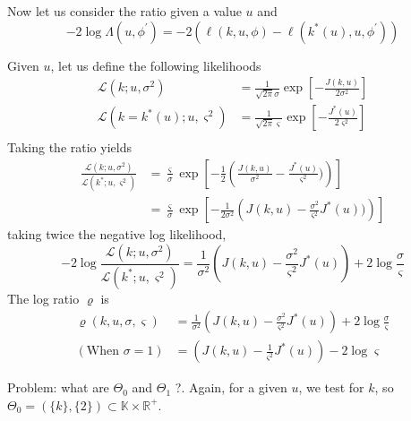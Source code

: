 \documentclass[a4paper,11pt]{article}
\newcommand{\Kspace}{\mathbb{K}}
\theoremstyle{defi}
\numberwithin{thmCounter}{section}
\begin{document}
Now let us consider the ratio given a value $u$ and  
\begin{equation}
  -2\log\Lambda(u, \phi^\prime) = -2\left(\ell(k, u, \phi) - \ell(k^*(u), u, \phi^\prime) \right)
\end{equation}

Given $u$, let us define the following likelihoods
\begin{align}
  \mathcal{L}(k ; u, \sigma^2) &= \frac{1}{\sqrt{2\pi}\sigma}\exp\left[-\frac{J(k,u)}{2\sigma^2}\right] \\
  \mathcal{L}(k=k^*(u) ; u, \varsigma^2) &= \frac{1}{\sqrt{2\pi}\varsigma}\exp\left[-\frac{J^*(u)}{2\varsigma^2}\right] \\
\end{align}
Taking the ratio yields
\begin{align}
  \frac{\mathcal{L}(k;u,\sigma^2)}{\mathcal{L}(k^*;u,\varsigma^2)} &= \frac{\varsigma}{\sigma}\exp\left[-\frac{1}{2}\left(\frac{J(k,u)}{\sigma^2} - \frac{J^*(u)}{\varsigma^2})\right)\right] \\
                                                                   &= \frac{\varsigma}{\sigma}\exp\left[-\frac{1}{2\sigma^2}\left(J(k,u)- \frac{\sigma^2}{\varsigma^2}J^*(u))\right)\right]
\end{align}
taking twice the negative log likelihood,
\begin{equation}
  -2\log \frac{\mathcal{L}(k;u,\sigma^2)}{\mathcal{L}(k^*;u,\varsigma^2)} = \frac{1}{\sigma^2}\left(J(k,u) - \frac{\sigma^2}{\varsigma^2}J^*(u)\right) +2\log\frac{\sigma}{\varsigma}
\end{equation}
The log ratio $\varrho$ is
\begin{align}
  \varrho(k, u, \sigma, \varsigma) &= \frac{1}{\sigma^2}\left(J(k,u) - \frac{\sigma^2}{\varsigma^2}J^*(u)\right) +2\log\frac{\sigma}{\varsigma} \\
  (\text{When } \sigma=1)                  &  = \left(J(k,u) - \frac{1}{\varsigma^2}J^*(u)\right) - 2\log\varsigma
\end{align}

Problem: what are $\Theta_0$ and $\Theta_1$ ?.
Again, for a given $u$, we test for $k$, so $\Theta_0 = (\{k\}, \{2\})\subset \Kspace \times \mathbb{R}^+$.
\end{document}
